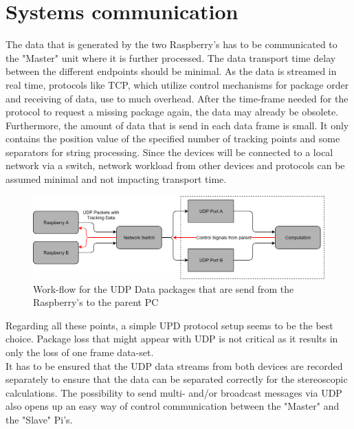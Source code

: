 \section{Systems communication}
The data that is generated by the two Raspberry's has to be communicated to the "Master" unit where it is further processed. The data transport time delay between the different endpoints should be minimal. As the data is streamed in real time, protocols like TCP, which utilize control mechanisms for package order and receiving of data, use to much overhead. After the time-frame needed for the protocol to request a missing package again, the data may already be obsolete. \\Furthermore, the amount of data that is send in each data frame is small. It only contains the position value of the specified number of tracking points and some separators for string processing. Since the devices will be connected to a local network via a switch, network workload from other devices and protocols can be assumed minimal and not impacting transport time.\\
\begin{figure}[H]
\includegraphics[width=\textwidth]{images/Network_Diagram.png}
\caption{Work-flow for the UDP Data packages that are send from the Raspberry's to the parent PC}
\label{img:netzwerk_diagram} 
\end{figure}
Regarding all these points, a simple UPD protocol setup seems to be the best choice. Package loss that might appear with UDP is not critical as it results in only the loss of one frame data-set.\\
It has to be ensured that the UDP data streams from both devices are recorded separately to ensure that the data can be separated correctly for the stereoscopic calculations.
The possibility to send multi- and/or broadcast messages via UDP also opens up an easy way of  control communication between the "Master" and the "Slave" Pi's.
